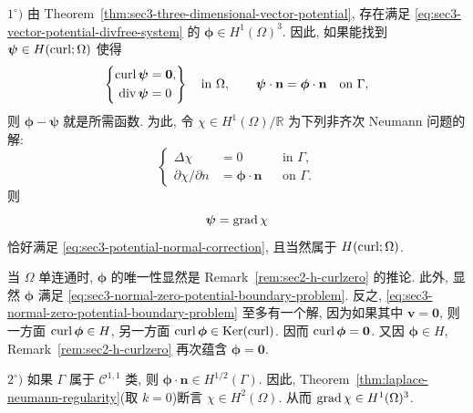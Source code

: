 \begin{Proof}
$1^\circ)$ 由 Theorem~\ref{thm:sec3-three-dimensional-vector-potential},
存在满足 \eqref{eq:sec3-vector-potential-divfree-system} 的
$\boldsymbol\phi\in H^1(\Omega)^3$. 因此, 如果能找到
$\boldsymbol\psi\in H(\operatorname{curl};\Omega)$ 使得
\begin{equation}\label{eq:sec3-potential-normal-correction}
\left\{\begin{aligned}
\operatorname{curl}\boldsymbol\psi&=\mathbf0,\\
\operatorname{div}\boldsymbol\psi&=0
\end{aligned}\right\}\quad\text{in }\Omega,
\qquad
\boldsymbol\psi\cdot\mathbf n=\boldsymbol\phi\cdot\mathbf n
\quad\text{on }\Gamma,
\end{equation}
则 $\boldsymbol\phi-\boldsymbol\psi$ 就是所需函数. 为此, 令
$\chi\in H^1(\Omega)/\mathbb R$ 为下列非齐次 Neumann 问题的解:
\begin{equation}\label{eq:sec3-potential-correction-neumann}
\left\{\begin{aligned}
\Delta\chi&=0&&\text{in }\Gamma,\\
\partial\chi/\partial n&=\boldsymbol\phi\cdot\mathbf n&&\text{on }\Gamma.
\end{aligned}\right.
\end{equation}
则
\[
\boldsymbol\psi=\operatorname{grad}\chi
\]
恰好满足 \eqref{eq:sec3-potential-normal-correction}, 且当然属于
$H(\operatorname{curl};\Omega)$.

当 $\Omega$ 单连通时, $\boldsymbol\phi$ 的唯一性显然是
Remark~\ref{rem:sec2-h-curlzero} 的推论. 此外, 显然 $\boldsymbol\phi$ 满足
\eqref{eq:sec3-normal-zero-potential-boundary-problem}. 反之,
\eqref{eq:sec3-normal-zero-potential-boundary-problem} 至多有一个解, 因为如果其中
$\mathbf v=\mathbf0$, 则一方面 $\operatorname{curl}\boldsymbol\phi\in H$, 另一方面
$\operatorname{curl}\boldsymbol\phi\in\operatorname{Ker}(\operatorname{curl})$. 因而
$\operatorname{curl}\boldsymbol\phi=\mathbf0$. 又因 $\boldsymbol\phi\in H$,
Remark~\ref{rem:sec2-h-curlzero} 再次蕴含 $\boldsymbol\phi=\mathbf0$.

$2^\circ)$ 如果 $\Gamma$ 属于 $\mathcal C^{1,1}$ 类, 则
$\boldsymbol\phi\cdot\mathbf n\in H^{1/2}(\Gamma)$. 因此,
Theorem~\ref{thm:laplace-neumann-regularity}(取 $k=0$)断言
$\chi\in H^2(\Omega)$. 从而 $\operatorname{grad}\chi\in H^1(\Omega)^3$.
\end{Proof}

